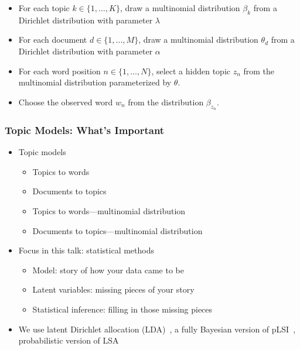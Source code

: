 {\begin{itemize}
\item<1-> For each topic $k \in \{1, \dots, K\}$, draw a multinomial distribution $\beta_k$ from a Dirichlet distribution with parameter $\lambda$
\item<2-> For each document $d \in \{1, \dots, M\}$, draw a multinomial distribution $\theta_d$ from a Dirichlet distribution with parameter $\alpha$
\item<3-> For each word position $n \in \{1, \dots, N\}$, select a hidden topic $z_n$ from the multinomial distribution parameterized by $\theta$.
\item<4-> Choose the observed word $w_n$ from the distribution $\beta_{z_n}$.
\end{itemize}

}

\fi

\begin{frame}
\frametitle{Topic Models: What's Important}
\begin{itemize}
\item Topic models 
\begin{itemize}
\ifhighlevel
	\item Topics to words
	\item Documents to topics
\else
	\item Topics to words---multinomial distribution
	\item Documents to topics---multinomial distribution
\fi
\end{itemize}
\item Focus in this talk: statistical methods
  \begin{itemize}
    \item Model: story of how your data came to be
    \item Latent variables: missing pieces of your story
    \item Statistical inference: filling in those missing pieces
  \end{itemize}
\item We use latent Dirichlet allocation (LDA)~\cite{blei-03}, a fully Bayesian
  version of pLSI~\cite{hofmann-99}, probabilistic version of
  LSA~\cite{landauer-97}
\end{itemize}

\end{frame}

